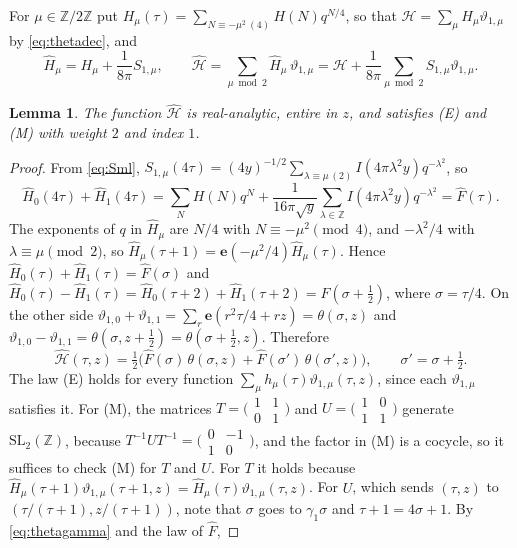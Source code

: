 \documentclass[11pt]{amsart}
\newtheorem{lemma}[theorem]{Lemma}
\theoremstyle{definition}
\newcommand{\ZZ}{\mathbb{Z}}
\newcommand{\vt}{\vartheta}
\newcommand{\Hc}{\mathcal{H}}
\newcommand{\Hh}{\widehat{\mathcal{H}}}
\newcommand{\e}{\mathbf{e}}
\begin{document}
For $\mu\in\ZZ/2\ZZ$ put $H_\mu(\tau)=\sum_{N\equiv-\mu^2\ (4)}H(N)q^{N/4}$, so that $\Hc=\sum_\mu H_\mu\vt_{1,\mu}$ by \eqref{eq:thetadec}, and
\[
\widehat H_\mu=H_\mu+\frac1{8\pi}S_{1,\mu},\qquad \Hh=\sum_{\mu\bmod 2}\widehat H_\mu\,\vt_{1,\mu}=\Hc+\frac1{8\pi}\sum_{\mu\bmod2}S_{1,\mu}\vt_{1,\mu}.
\]

\begin{lemma}\label{lem:Hhat}
The function $\Hh$ is real-analytic, entire in $z$, and satisfies \textup{(E)} and \textup{(M)} with weight $2$ and index $1$.
\end{lemma}

\begin{proof}
From \eqref{eq:Sml}, $S_{1,\mu}(4\tau)=(4y)^{-1/2}\sum_{\lambda\equiv\mu\,(2)}I(4\pi\lambda^2y)q^{-\lambda^2}$, so
\[
\widehat H_0(4\tau)+\widehat H_1(4\tau)=\sum_{N}H(N)q^N+\frac1{16\pi\sqrt y}\sum_{\lambda\in\ZZ}I(4\pi\lambda^2y)q^{-\lambda^2}=\widehat F(\tau).
\]
The exponents of $q$ in $\widehat H_\mu$ are $N/4$ with $N\equiv-\mu^2\pmod 4$, and $-\lambda^2/4$ with $\lambda\equiv\mu\pmod2$, so $\widehat H_\mu(\tau+1)=\e(-\mu^2/4)\widehat H_\mu(\tau)$. Hence $\widehat H_0(\tau)+\widehat H_1(\tau)=\widehat F(\sigma)$ and $\widehat H_0(\tau)-\widehat H_1(\tau)=\widehat H_0(\tau+2)+\widehat H_1(\tau+2)=\widehat F(\sigma+\frac12)$, where $\sigma=\tau/4$. On the other side $\vt_{1,0}+\vt_{1,1}=\sum_r\e(r^2\tau/4+rz)=\theta(\sigma,z)$ and $\vt_{1,0}-\vt_{1,1}=\theta(\sigma,z+\frac12)=\theta(\sigma+\frac12,z)$. Therefore
\[
\Hh(\tau,z)=\tfrac12\bigl(\widehat F(\sigma)\,\theta(\sigma,z)+\widehat F(\sigma')\,\theta(\sigma',z)\bigr),\qquad \sigma'=\sigma+\tfrac12 .
\]
The law (E) holds for every function $\sum_\mu h_\mu(\tau)\vt_{1,\mu}(\tau,z)$, since each $\vt_{1,\mu}$ satisfies it. For (M), the matrices $T=\bigl(\begin{smallmatrix}1&1\\0&1\end{smallmatrix}\bigr)$ and $U=\bigl(\begin{smallmatrix}1&0\\1&1\end{smallmatrix}\bigr)$ generate $\mathrm{SL}_2(\ZZ)$, because $T^{-1}UT^{-1}=\bigl(\begin{smallmatrix}0&-1\\1&0\end{smallmatrix}\bigr)$, and the factor in (M) is a cocycle, so it suffices to check (M) for $T$ and $U$. For $T$ it holds because $\widehat H_\mu(\tau+1)\vt_{1,\mu}(\tau+1,z)=\widehat H_\mu(\tau)\vt_{1,\mu}(\tau,z)$. For $U$, which sends $(\tau,z)$ to $(\tau/(\tau+1),z/(\tau+1))$, note that $\sigma$ goes to $\gamma_1\sigma$ and $\tau+1=4\sigma+1$. By \eqref{eq:thetagamma} and the law of $\widehat F$,

\end{proof}
\end{document}
